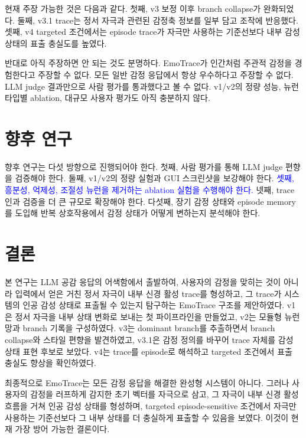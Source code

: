 ﻿\documentclass[11pt,a4paper]{article}
\begin{document}
현재 주장 가능한 것은 다음과 같다. 첫째, v3 보정 이후 branch collapse가 완화되었다. 둘째, v3.1 trace는 정서 자극과 관련된 감정축 정보를 일부 담고 조작에 반응했다. 셋째, v4 targeted 조건에서는 episode trace가 자극만 사용하는 기준선보다 내부 감성 상태의 표출 충실도를 높였다.

반대로 아직 주장하면 안 되는 것도 분명하다. EmoTrace가 인간처럼 주관적 감정을 경험한다고 주장할 수 없다. 모든 일반 감정 응답에서 항상 우수하다고 주장할 수 없다. LLM judge 결과만으로 사람 평가를 통과했다고 볼 수 없다. v1/v2의 정량 성능, 뉴런 타입별 ablation, 대규모 사용자 평가도 아직 충분하지 않다.

\section{향후 연구}

향후 연구는 다섯 방향으로 진행되어야 한다. 첫째, 사람 평가를 통해 LLM judge 편향을 검증해야 한다. 둘째, v1/v2의 정량 실험과 GUI 스크린샷을 보강해야 한다. \textcolor{blue}{셋째, 흥분성, 억제성, 조절성 뉴런을 제거하는 ablation 실험을 수행해야 한다.} 넷째, trace 인과 검증을 더 큰 규모로 확장해야 한다. 다섯째, 장기 감정 상태와 episode memory를 도입해 반복 상호작용에서 감정 상태가 어떻게 변하는지 분석해야 한다.

\section{결론}

본 연구는 LLM 공감 응답의 어색함에서 출발하여, 사용자의 감정을 맞히는 것이 아니라 입력에서 얻은 거친 정서 자극이 내부 신경 활성 trace를 형성하고, 그 trace가 시스템의 인공 감성 상태로 표출될 수 있는지 탐구하는 EmoTrace 구조를 제안하였다. v1은 정서 자극을 내부 상태 변화로 보내는 첫 파이프라인을 만들었고, v2는 모듈형 뉴런망과 branch 기록을 구성하였다. v3는 dominant branch를 추출하면서 branch collapse와 스타일 편향을 발견하였고, v3.1은 감정 정의를 바꾸어 trace 자체를 감성 상태 표현 후보로 보았다. v4는 trace를 episode로 해석하고 targeted 조건에서 표출 충실도 향상을 확인하였다.

최종적으로 EmoTrace는 모든 감정 응답을 해결한 완성형 시스템이 아니다. 그러나 사용자의 감정을 러프하게 감지한 초기 벡터를 자극으로 삼고, 그 자극이 내부 신경 활성 흐름을 거쳐 인공 감성 상태를 형성하며, targeted episode-sensitive 조건에서 자극만 사용하는 기준선보다 그 내부 상태를 더 충실하게 표출할 수 있음을 보였다. 이것이 현재 가장 방어 가능한 결론이다.

\appendix
\end{document}
